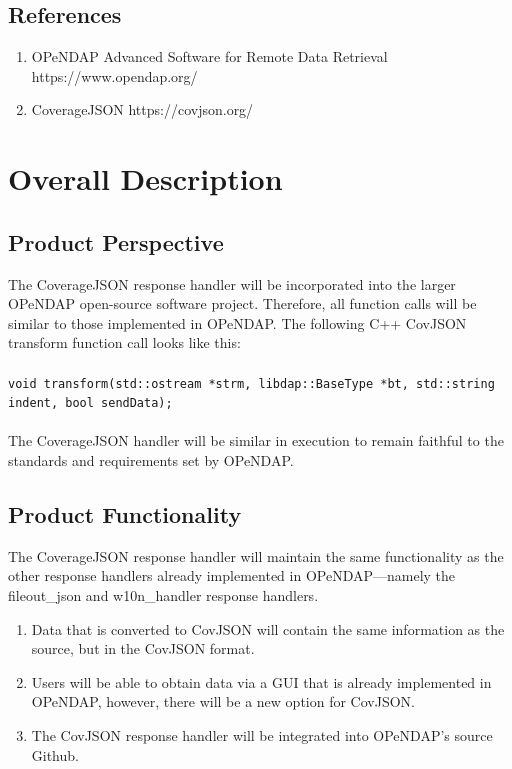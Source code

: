 \documentclass[onecolumn, draftclsnofoot,10pt, compsoc]{IEEEtran}
\begin{document}
\subsection{References}
\begin{enumerate}
\item OPeNDAP Advanced Software for Remote Data Retrieval https://www.opendap.org/
\item CoverageJSON https://covjson.org/
\end{enumerate}


\section{Overall Description}
\subsection{Product Perspective}
The CoverageJSON response handler will be incorporated into the larger OPeNDAP open-source software project. Therefore, all function calls will be similar to those implemented in OPeNDAP. The following C++ CovJSON transform function call looks like this: 
\\\\
\texttt{void transform(std::ostream *strm, libdap::BaseType *bt, std::string indent, bool sendData);}
\\\\The CoverageJSON handler will be similar in execution to remain faithful to the standards and requirements set by OPeNDAP.

\subsection{Product Functionality}
The CoverageJSON response handler will maintain the same functionality as the other response handlers already implemented in OPeNDAP---namely the fileout\_json and w10n\_handler response handlers.
\begin{enumerate}
\item Data that is converted to CovJSON will contain the same information as the source, but in the CovJSON format. 
\item Users will be able to obtain data via a GUI that is already implemented in OPeNDAP, however, there will be a new option for CovJSON.
\item The CovJSON response handler will be integrated into OPeNDAP's source Github. 
\end{enumerate}
\end{document}
